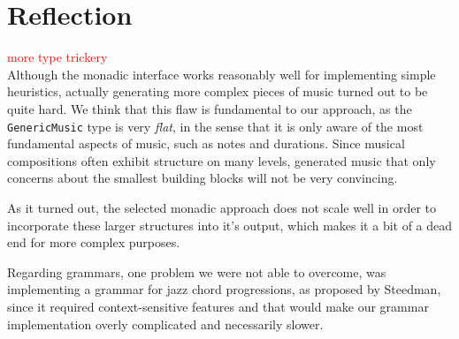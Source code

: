 \documentclass[11pt,a4paper]{article}
\newcommand{\icode}[1]{\texttt{#1}}
\newcommand\todo[1]{\textcolor{red}{#1}}
\begin{document}
\section{Reflection}
\todo{more type trickery}\\
Although the monadic interface works reasonably well for implementing simple heuristics, actually generating more complex pieces of music turned out to be quite hard. We think that this flaw is fundamental to our approach, as the \icode{GenericMusic} type is very \emph{flat}, in the sense that it is only aware of the most fundamental aspects of music, such as notes and durations. Since musical compositions often exhibit structure on many levels, generated music that only concerns about the smallest building blocks will not be very convincing.

As it turned out, the selected monadic approach does not scale well in order to incorporate these larger structures into it's output, which makes it a bit of a dead end for more complex purposes.

Regarding grammars, one problem we were not able to overcome, was implementing a grammar for jazz chord progressions, as proposed by Steedman\cite{jazzchords}, since it required context-sensitive features and that would make our grammar implementation overly complicated and necessarily slower.\\

\newpage


\end{document}
